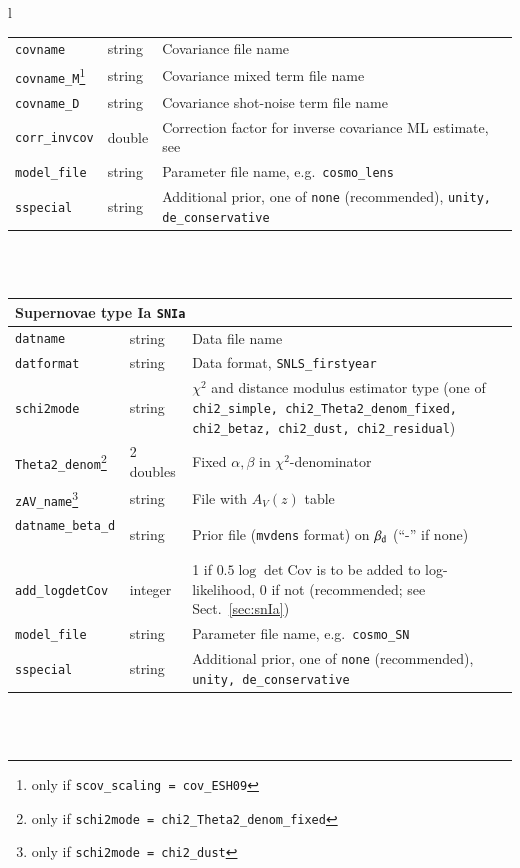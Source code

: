 \documentclass[11pt, chapterprefix, headsepline]{scrartcl}
\newcommand{\onlyif}[2]{\footnote{only if \texttt{#1 =\; #2}}}
\newcommand{\mythemp}{$^{\renewcommand{\thempfootnote}{\alph{mpfootnote}}\thempfootnote}$}
\begin{document}
\begin{longtable}{l}
\begin{minipage}{\textwidth}
\begin{tabularx}{\textwidth}{llX}
    \texttt{covname}   & string & Covariance file name \\
    \texttt{covname\_M}\onlyif{scov\_scaling}{cov\_ESH09} & string & Covariance mixed term file name \\
    \texttt{covname\_D}\mythemp & string & Covariance shot-noise term file name \\
    \texttt{corr\_invcov} & double & Correction factor for inverse
    covariance ML estimate, see \cite{HSS07} \\
    \texttt{model\_file}   & string & Parameter file name, e.g.~\texttt{cosmo\_lens} \\
    \texttt{sspecial}   & string & Additional prior, one of
    \texttt{none} (recommended), \texttt{unity, de\_conservative} \\
    \end{tabularx}
\end{minipage}
\\ \\

\begin{minipage}{\textwidth}
  \begin{tabularx}{\textwidth}{llX}
   \hline \multicolumn{3}{l}{\rul Supernovae type Ia \quad \texttt{SNIa}} \\ \hline
    \texttt{datname}   & string & Data file name \\
    \texttt{datformat} & string & Data format, \texttt{SNLS\_firstyear} \\
    \texttt{schi2mode} & string & $\chi^2$ and distance modulus
    estimator type (one of \texttt{chi2\_simple, chi2\_Theta2\_denom\_fixed,
      chi2\_betaz, chi2\_dust, chi2\_residual}) \\
    \texttt{Theta2\_denom}\onlyif{schi2mode}{chi2\_Theta2\_denom\_fixed} & 2 doubles & Fixed $\alpha, \beta$ in
    $\chi^2$-denominator \\
    \texttt{zAV\_name}\onlyif{schi2mode}{chi2\_dust} & string & File with $A_V(z)$ table \\
    \texttt{datname\_beta\_d}\mythemp & string & Prior file
    (\texttt{mvdens} format) on $\beta_{\rm d}$
    (``-'' if none) \\
    \texttt{add\_logdetCov} & integer & 1 if $0.5\log\det\mbox{Cov}$ is
    to be added to log-likelihood, 0 if not (recommended; see
    Sect.~\ref{sec:snIa}) \\
    \texttt{model\_file}   & string & Parameter file name, e.g.~\texttt{cosmo\_SN} \\
    \texttt{sspecial}   & string & Additional prior, one of
    \texttt{none} (recommended), \texttt{unity, de\_conservative} \\
    \hline
    \end{tabularx}
\end{minipage}
\\ \\


\end{longtable}
\end{document}
